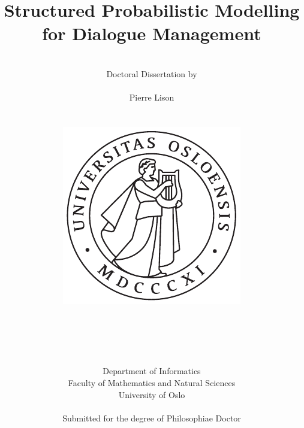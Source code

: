 \documentclass[english,12pt]{uiophd}
\title{\Huge{Structured Probabilistic Modelling \\ for Dialogue Management}}
\author{\\
Doctoral Dissertation by\\
\\
\Large{Pierre Lison} \\
\\
\\
 \includegraphics[scale=0.5]{imgs/uio.pdf}
\\
\\
\\
\\
\\
\\
 Department of Informatics\\
Faculty of Mathematics and Natural Sciences\\
University of Oslo\\
\\
Submitted for the degree of Philosophiae Doctor}
\begin{document}
\frontmatter
\maketitle

\chapterfont{\centering}





\chapterfont{\raggedright}

\tableofcontents

\mainmatter

















\appendix







\backmatter




\newpage
{}

\printindex
\end{document}
